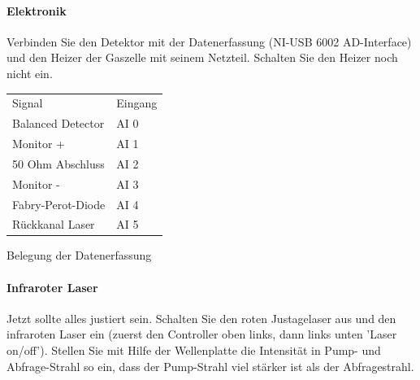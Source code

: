 \paragraph*{Elektronik} Verbinden Sie den Detektor  mit der Datenerfassung (NI-USB 6002 AD-Interface) und den Heizer der Gaszelle mit seinem Netzteil. Schalten Sie den Heizer noch nicht ein.

\begin{margintable}
    \begin{tabular}{ll}
        Signal & Eingang \\
        Balanced Detector & AI 0 \\
        Monitor + & AI 1 \\
        50 Ohm Abschluss & AI 2 \\
        Monitor - & AI 3 \\
        Fabry-Perot-Diode & AI 4 \\
        Rückkanal Laser & AI 5
    \end{tabular}
    \caption{Belegung der Datenerfassung}
\end{margintable}

\paragraph*{Infraroter Laser} Jetzt sollte alles justiert sein. Schalten Sie den roten Justagelaser aus und  den infraroten Laser ein (zuerst den Controller oben links, dann links unten 'Laser on/off'). Stellen Sie mit Hilfe der Wellenplatte die Intensität in Pump- und Abfrage-Strahl so ein, dass der Pump-Strahl viel stärker ist als der Abfragestrahl.




\begin{questions}
\end{questions}

